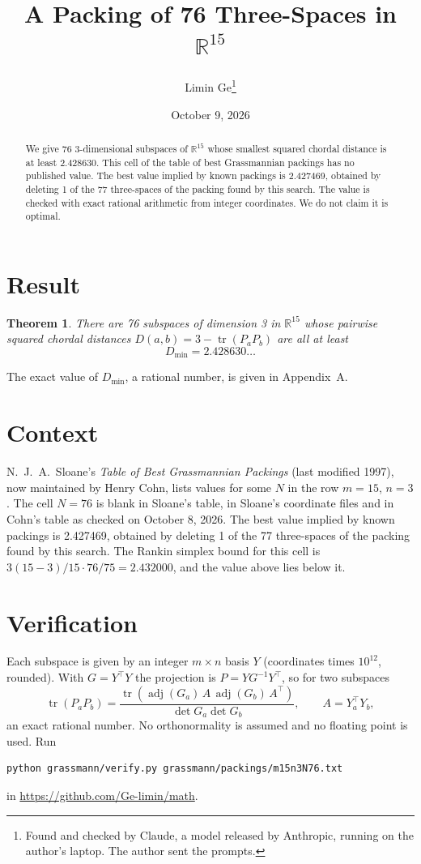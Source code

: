 \documentclass[11pt,a4paper]{article}
\title{A Packing of 76 Three-Spaces in $\mathbb{R}^{15}$}
\author{Limin Ge\thanks{Found and checked by Claude, a model released by Anthropic, running on the author's laptop. The author sent the prompts.}}
\date{October 9, 2026}
\newtheorem*{theorem}{Theorem}
\begin{document}
\maketitle
\begin{abstract}
We give 76 3-dimensional subspaces of $\mathbb{R}^{15}$ whose smallest squared chordal distance is at least 2.428630. This cell of the table of best Grassmannian packings has no published value. The best value implied by known packings is 2.427469, obtained by deleting 1 of the 77 three-spaces of the packing found by this search. The value is checked with exact rational arithmetic from integer coordinates. We do not claim it is optimal.
\end{abstract}

\section{Result}
\begin{theorem}
There are 76 subspaces of dimension 3 in $\mathbb{R}^{15}$ whose pairwise squared chordal distances $D(a,b) = 3 - \operatorname{tr}(P_aP_b)$ are all at least
\[ D_{\min} = 2.428630\ldots \]
\end{theorem}
The exact value of $D_{\min}$, a rational number, is given in Appendix~A.


\section{Context}
N.~J.~A.~Sloane's \emph{Table of Best Grassmannian Packings} (last modified 1997), now maintained by Henry Cohn, lists values for some $N$ in the row $m=15$, $n=3$. The cell $N=76$ is blank in Sloane's table, in Sloane's coordinate files and in Cohn's table as checked on October 8, 2026. The best value implied by known packings is 2.427469, obtained by deleting 1 of the 77 three-spaces of the packing found by this search. The Rankin simplex bound for this cell is $3(15-3)/15\cdot 76/75 = 2.432000$, and the value above lies below it.


\section{Verification}
Each subspace is given by an integer $m\times n$ basis $Y$ (coordinates times $10^{12}$, rounded). With $G=Y^\top Y$ the projection is $P=YG^{-1}Y^\top$, so for two subspaces
\[ \operatorname{tr}(P_aP_b)=\frac{\operatorname{tr}(\operatorname{adj}(G_a)\,A\,\operatorname{adj}(G_b)\,A^\top)}{\det G_a\det G_b},\qquad A=Y_a^\top Y_b, \]
an exact rational number. No orthonormality is assumed and no floating point is used. Run
\begin{verbatim}
python grassmann/verify.py grassmann/packings/m15n3N76.txt
\end{verbatim}
in \url{https://github.com/Ge-limin/math}.
\end{document}
